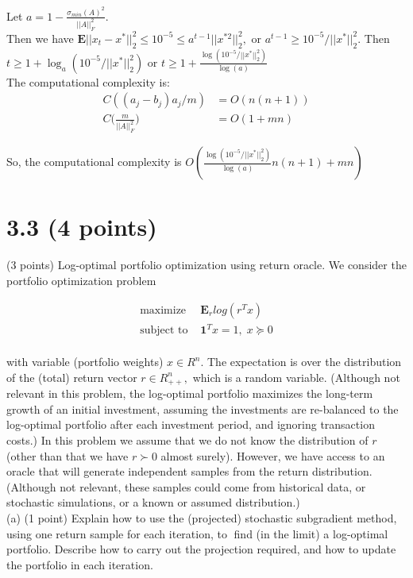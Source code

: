 \documentclass{article}
\begin{document}
Let $a = 1 - \frac{\sigma_{min}(A)^2}{||A||_F^2}.$\\
Then we have 
$\mathbf{E}||x_t - x^*||_2^2 \leq 10^{-5} 
\leq a^{t - 1}||x^{*2}||_2^2, $ 
or $a^{t-1} \geq 10^{-5} / ||x^*||_2^2.$ 
Then $t \geq 1 + \log_a(10^{-5} / ||x^*||_2^2)$ or 
$t \geq 1 + \frac{\log(10^{-5} / ||x^*||_2^2)}{\log(a)}$
\\

The computational complexity is:
\begin{align*}
	C((a_j - b_j) a_j / m) &= O(n (n + 1)) \\
	C\big(\frac{m}{||A||_F^2} \big) &= O(1 + mn)
\end{align*}

So, the computational complexity 
is 
$O(\frac{\log(10^{-5} / ||x^*||_2^2)}{\log(a)} n(n+1)  + mn)$


\section*{3.3 (4 points)} 

(3 points) Log-optimal portfolio optimization using return oracle. We consider the portfolio optimization problem

\begin{align*}
	\text{maximize } &\mathbf{E}_r log(r^T x) \\
	\text{subject to } & \mathbf{1}^T x = 1, \;
	x \succeq 0\\
\end{align*}

with variable (portfolio weights) $x \in R^n$. The expectation is over the distribution of
the (total) return vector $r \in R^n_{++},$ which is a random variable. (Although not relevant
in this problem, the log-optimal portfolio maximizes the long-term growth of an initial
investment, assuming the investments are re-balanced to the log-optimal portfolio after
each investment period, and ignoring transaction costs.)
In this problem we assume that we do not know the distribution of $r$ (other than
that we have $r \succ 0$ almost surely). However, we have access to an oracle that will
generate independent samples from the return distribution. (Although not relevant,
these samples could come from historical data, or stochastic simulations, or a known
or assumed distribution.) \\

(a) (1 point) Explain how to use the (projected) stochastic subgradient method, using
one return sample for each iteration, to find (in the limit) a log-optimal portfolio.
Describe how to carry out the projection required, and how to update the portfolio
in each iteration. \\
\end{document}
